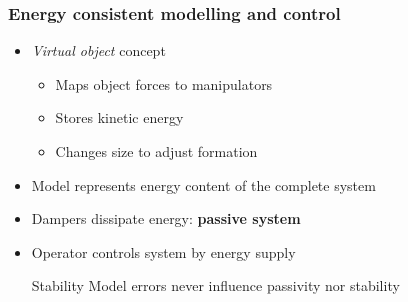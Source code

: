 \documentclass[student]{ITRslides}
\begin{document}
\begin{frame}
\begin{itemize}

\end{itemize}

\end{frame}


\begin{frame}
	\frametitle{Energy consistent modelling and control}
	\begin{itemize}
		\item \emph{Virtual object} concept
			\begin{itemize}%
  				\renewcommand{\labelitemi}{$\Rightarrow$}
				\item Maps object forces to manipulators
				\item Stores kinetic energy
				\item Changes size to adjust formation
			\end{itemize}
		\item Model represents energy content of the complete system
		\item Dampers dissipate energy: \textbf{passive system}
		\item Operator controls system by energy supply
			\begin{block}{Stability}
Model errors never influence passivity nor stability \cite{Stramigioli_01}
	\end{block}	
		\end{itemize}


\end{frame}
\end{document}
